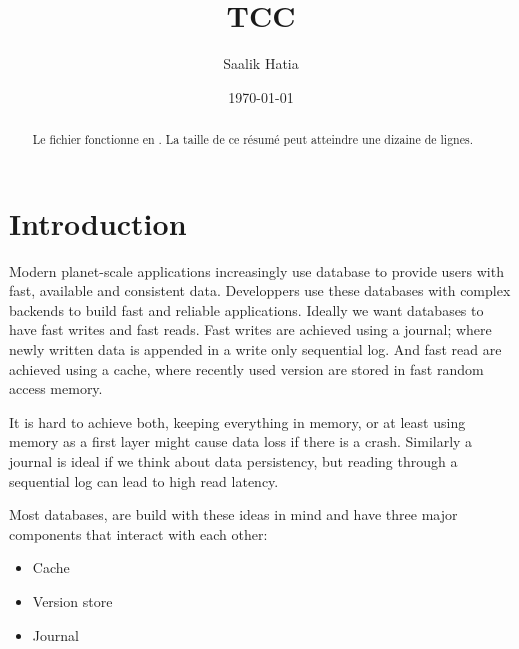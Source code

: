 \documentclass[parallelisme]{compas2022}
\begin{document}
\title{TCC}

\author{Saalik Hatia}%

\address{Université Pierre et Marie Curie\\
Laboratoire LIP6 \\
4, place jussieu\\
75005 Paris - France\\
saalik.hatia@lip6.fr}

\date{\today}

\maketitle

\begin{abstract}
  Le fichier fonctionne en \LaTeXe. La taille
  de ce résumé peut atteindre une dizaine de lignes.
\end{abstract}


\section{Introduction}

Modern planet-scale applications increasingly use database to provide users with fast, available and consistent data.
Developpers use these databases with complex backends to build fast and reliable applications.
Ideally we want databases to have fast writes and fast reads.
Fast writes are achieved using a journal; where newly written data is appended in a write only sequential log.
And fast read are achieved using a cache, where recently used version are stored in fast random access memory.

It is hard to achieve both, keeping everything in memory, or at least using memory as a first layer might cause data loss if there is a crash.
Similarly a journal is ideal if we think about data persistency, but reading through a sequential log can lead to high read latency.

Most databases, are build with these ideas in mind and have three major components that interact with each other:
\begin{itemize}
  \item Cache
  \item Version store
  \item Journal
\end{itemize}
\end{document}

